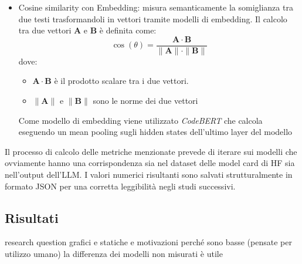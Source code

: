 \documentclass{article}
\begin{document}
\begin{itemize}
    \item Cosine similarity con Embedding: misura semanticamente la somiglianza tra due testi trasformandoli in vettori tramite modelli di embedding. Il calcolo tra due vettori $\mathbf{A}$ e $\mathbf{B}$ è definita come:
    \[
        \cos(\theta) = \frac{\mathbf{A} \cdot \mathbf{B}}{\|\mathbf{A}\| \cdot \|\mathbf{B}\|}
    \]
    dove:
    \begin{itemize}
        \item $\mathbf{A} \cdot \mathbf{B}$ è il prodotto scalare tra i due vettori.
        \item $\|\mathbf{A}\|$ e $\|\mathbf{B}\|$ sono le norme dei due vettori
    \end{itemize}
    Come modello di embedding viene utilizzato \textit{CodeBERT} che calcola eseguendo un mean pooling sugli hidden states dell’ultimo layer del modello
\end{itemize}
Il processo di calcolo delle metriche menzionate prevede di iterare sui modelli che ovviamente hanno una corrispondenza sia nel dataset delle model card di HF sia nell'output dell'LLM. I valori numerici risultanti sono salvati strutturalmente in formato JSON per una corretta leggibilità negli studi successivi.

\subsection{Risultati}
research question
grafici e statiche e motivazioni perché sono basse (pensate per utilizzo umano)
la differenza dei modelli non misurati è utile
\end{document}
